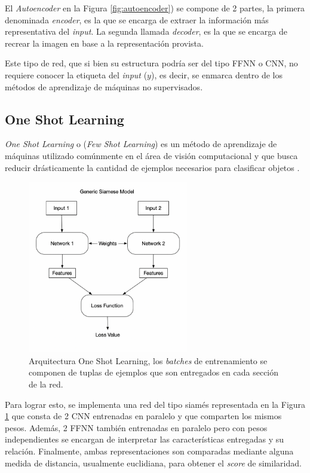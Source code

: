 El \textit{Autoencoder} en la Figura \ref{fig:autoencoder}) se compone de 2 partes, la primera denominada \textit{encoder}, es la que se encarga de extraer la información más representativa del \textit{input}. La segunda llamada \textit{decoder}, es la que se encarga de recrear la imagen en base a la representación provista. 

\vspace{0.2cm}

Este tipo de red, que si bien su estructura podría ser del tipo FFNN o CNN, no requiere conocer la etiqueta del \textit{input} ($y$), es decir, se enmarca dentro de los métodos de aprendizaje de máquinas no supervisados. 

\subsection{One Shot Learning}

\textit{One Shot Learning} o (\textit{Few Shot Learning}) es un método de aprendizaje de máquinas utilizado comúnmente en el área de visión computacional y que busca reducir drásticamente la cantidad de ejemplos necesarios para clasificar objetos \cite{OMAHONY2019186}.

\vspace{0.2cm}

\begin{figure}[ht]
    \centering
    \includegraphics[width=7cm]{img/tesis/siamese.png}
    \caption{Arquitectura One Shot Learning, los \textit{batches} de entrenamiento se componen de tuplas de ejemplos que son entregados en cada sección de la red.}
    \label{fig:oneshot}
\end{figure}


Para lograr esto, se implementa una red del tipo siamés representada en la Figura \ref{fig:oneshot} que consta de 2 CNN entrenadas en paralelo y que comparten los mismos pesos. Además, 2 FFNN también entrenadas en paralelo pero con pesos independientes se encargan de interpretar las características entregadas y su relación. Finalmente, ambas representaciones son comparadas mediante alguna medida de distancia, usualmente euclidiana, para obtener el \textit{score} de similaridad. 

